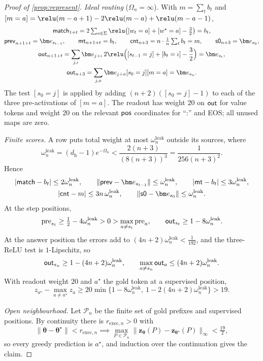 \begin{proof}[Proof of \cref{prop:represent}]
\emph{Ideal routing} ($\Omega_n=\infty$). With $m=\sum_tb_t$ and $[m=a]=\relu(m-a+1)-2\relu(m-a)+\relu(m-a-1)$,
\begin{gather*}
 \reg{match}_{1+t}=2\textstyle\sum_{a\in\Sigma}\relu\bigl([w_t=a]+[w^\star=a]-\frac{3}{2}\bigr)=b_t,\\
 \reg{prev}_{n+1+t}=\bm e_{s_{t-1}},\qquad \reg{mt}_{n+1+t}=b_t,\qquad
 \reg{cnt}_{n+3}=n\cdot\tfrac{1}{n}\textstyle\sum_tb_t=m,\qquad \reg{s0}_{n+3}=\bm e_{s_0},\\
 \reg{out}_{n+1+t}=\sum_{j,\iota}\bm e_{j+\iota}\,2\relu\Bigl([s_{t-1}=j]+[b_t=\iota]-\frac{3}{2}\Bigr)=\bm e_{s_t},\\
 \reg{out}_{n+3}=\sum_{j,a}\bm e_{j+a}[s_0=j][m=a]=\bm e_{s_n}.
\end{gather*}
The test $[s_0=j]$ is applied by adding $(n+2)([s_0=j]-1)$ to each of the three pre-activations of $[m=a]$. The readout has weight $20$
on $\mathsf{out}$ for value tokens and weight $20$ on the relevant $\mathsf{pos}$ coordinates for ``:'' and EOS; all unused maps are zero.

\emph{Finite scores.} A row puts total weight at most $\omega^{\mathrm{leak}}_n$ outside its sources, where
\[
 \omega^{\mathrm{leak}}_n=(d_{\mathrm h}-1)e^{-\Omega_n}<\frac{2(n+3)}{(8(n+3))^3}=\frac{1}{256(n+3)^2}.
\]
Hence
\begin{gather*}
 |\reg{match}-b_t|\le2\omega^{\mathrm{leak}}_n,\qquad \|\reg{prev}-\bm e_{s_{t-1}}\|\le\omega^{\mathrm{leak}}_n,\qquad |\reg{mt}-b_t|\le3\omega^{\mathrm{leak}}_n,\\
 |\reg{cnt}-m|\le3n\,\omega^{\mathrm{leak}}_n,\qquad \|\reg{s0}-\bm e_{s_0}\|\le\omega^{\mathrm{leak}}_n .
\end{gather*}
At the step positions,
\[
 \mathrm{pre}_{s_t}\ge\tfrac{1}{2}-4\omega^{\mathrm{leak}}_n>0>\max_{a\ne s_t}\mathrm{pre}_a,\qquad \mathsf{out}_{s_t}\ge1-8\omega^{\mathrm{leak}}_n .
\]
At the answer position the errors add to $(4n+2)\omega^{\mathrm{leak}}_n<\frac{1}{192}$, and the three-ReLU test is $1$-Lipschitz, so
\[
 \mathsf{out}_{s_n}\ge1-(4n+2)\omega^{\mathrm{leak}}_n,\qquad \max_{a\ne s_n}\mathsf{out}_a\le(4n+2)\omega^{\mathrm{leak}}_n .
\]
With readout weight $20$ and $a^\star$ the gold token at a supervised position,
\[
 z_{a^\star}-\max_{a\ne a^\star}z_a\ge20\min\bigl\{1-8\omega^{\mathrm{leak}}_n,\ 1-2(4n+2)\omega^{\mathrm{leak}}_n\bigr\}>19 .
\]

\emph{Open neighbourhood.} Let $\mathcal P_n$ be the finite set of gold prefixes and supervised positions. By continuity there is
$r_{\mathrm{exec},n}>0$ with
\[
 \|\bm\theta-\bm\theta^\star\|<r_{\mathrm{exec},n}\implies\max_{P\in\mathcal P_n}\|\bm z_{\bm\theta}(P)-\bm z_{\bm\theta^\star}(P)\|_\infty<\tfrac{19}{2},
\]
so every greedy prediction is $a^\star$, and induction over the continuation gives the claim.
\end{proof}


